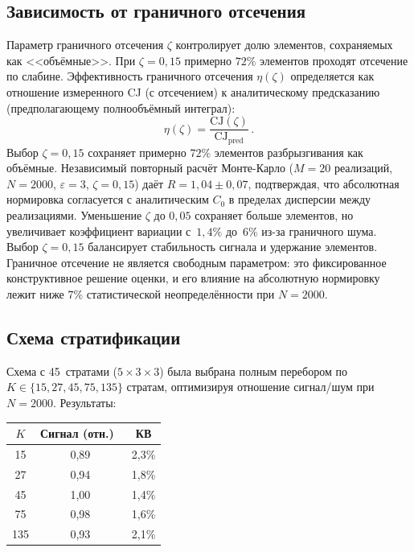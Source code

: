 \documentclass[12pt,a4paper]{article}
\theoremstyle{plain}
\theoremstyle{definition}
\theoremstyle{remark}
\newcommand{\CJ}{\mathrm{CJ}}
\begin{document}
\subsection{Зависимость от граничного отсечения}
\label{sec:zeta-dep}

Параметр граничного отсечения $\zeta$ контролирует долю
элементов, сохраняемых как <<объёмные>>.  При $\zeta = 0{,}15$
примерно $72\%$ элементов проходят отсечение по слабине.
Эффективность граничного отсечения $\eta(\zeta)$ определяется
как отношение измеренного CJ (с отсечением) к аналитическому
предсказанию (предполагающему полнообъёмный интеграл):
\begin{equation}\label{eq:eta}
  \eta(\zeta) = \frac{\CJ(\zeta)}{\CJ_{\mathrm{pred}}}\,.
\end{equation}
Выбор $\zeta = 0{,}15$ сохраняет примерно $72\%$ элементов
разбрызгивания как объёмные.  Независимый повторный расчёт
Монте-Карло ($M = 20$ реализаций, $N = 2000$,
$\varepsilon = 3$, $\zeta = 0{,}15$) даёт
$R = 1{,}04 \pm 0{,}07$, подтверждая, что абсолютная
нормировка согласуется с аналитическим $C_0$ в пределах
дисперсии между реализациями.  Уменьшение $\zeta$ до $0{,}05$
сохраняет больше элементов, но увеличивает коэффициент
вариации с~$1{,}4\%$ до~$6\%$ из-за граничного шума.  Выбор
$\zeta = 0{,}15$ балансирует стабильность сигнала и удержание
элементов.  Граничное отсечение не является свободным
параметром: это фиксированное конструктивное решение оценки,
и его влияние на абсолютную нормировку лежит ниже $7\%$
статистической неопределённости при $N = 2000$.

\subsection{Схема стратификации}
\label{sec:strat-dep}

Схема с 45~стратами ($5 \times 3 \times 3$) была выбрана
полным перебором по $K \in \{15, 27, 45, 75, 135\}$ стратам,
оптимизируя отношение сигнал/шум при $N = 2000$.  Результаты:

\begin{center}
\begin{tabular}{ccc}
\toprule
$K$ & Сигнал (отн.)\ & КВ \\
\midrule
15 & 0,89 & 2,3\% \\
27 & 0,94 & 1,8\% \\
45 & 1,00 & 1,4\% \\
75 & 0,98 & 1,6\% \\
135 & 0,93 & 2,1\% \\
\bottomrule
\end{tabular}
\end{center}
\end{document}
